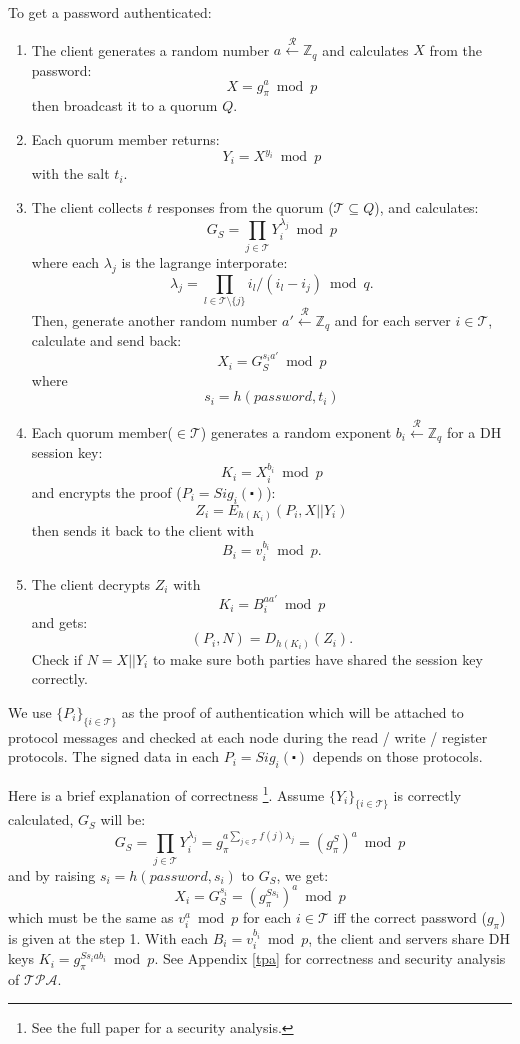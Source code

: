 To get a password authenticated:
\begin{enumerate}
\item The client generates a random number
  $a \xleftarrow{\mathcal{R}} \mathbb{Z}_q$
  and calculates $X$ from the password:
  \[
    X = g_{\pi}^a \bmod p
  \]
  then broadcast it to a quorum $Q$.

\item Each quorum member returns:
  \[
    Y_i = X^{y_i} \bmod p
  \]
  with the salt $t_i$.

\item The client collects $t$ responses from the quorum ($\mathcal{T}
  \subseteq Q$), and
  calculates:
  \[
    G_S = \prod_{j \in \mathcal{T}}Y_i^{\lambda_j} \bmod p
  \]
  where each $\lambda_j$ is the lagrange interporate:
  \[
    \lambda_j = \prod_{l \in \mathcal{T} \setminus \{j\}}
    i_l / (i_l - i_j) \bmod q.
  \]
  Then, generate another random number $a' \xleftarrow{\mathcal{R}}
  \mathbb{Z}_q$ and for each server $i \in \mathcal{T}$, calculate and
  send back:
  \[
    X_i = G_S^{s_ia'} \bmod p
  \]
  where
  \[
    s_i = h(password, t_i)
  \]

\item Each quorum member($\in \mathcal{T}$) generates a random exponent
  $b_i \xleftarrow{\mathcal{R}} \mathbb{Z}_q$
  for a DH session key:
  \[ K_i = X_i^{b_i} \bmod p \]
  and encrypts the proof ($P_i = Sig_i(\centerdot)$):
  \[
    Z_i = E_{h(K_i)}(P_i, X || Y_i)
  \]
  then sends it back to the client with
  \[
    B_i = v_i^{b_i} \bmod p.
  \]

\item The client decrypts $Z_i$ with
  \[
    K_i = B_i^{aa'} \bmod p
  \]
  and gets:
  \[
    (P_i, N) = D_{h(K_i)}(Z_i).
  \]
  Check if $N = X||Y_i$ to make sure both parties have shared the
  session key correctly. 
\end{enumerate}
We use $\{P_i\}_{\{i \in \mathcal{T}\}}$ as the proof of
authentication which will be attached to protocol messages and checked
at each node during the {\sf read / write / register} protocols. The
signed data in each $P_i = Sig_i(\centerdot)$ depends on those
protocols.

\ifdefined\ABSTRACT
Here is a brief explanation of correctness
\footnote{See the full paper for a security analysis.}.
Assume $\{Y_i\}_{\{i \in \mathcal{T}\}}$ is correctly calculated,
$G_S$ will be:
\[
  G_S = \prod_{j \in \mathcal{T}}Y_i^{\lambda_j} = g_{\pi}^{a \sum_{j
      \in \mathcal{T}} f(j) \lambda_j} = (g_{\pi}^S)^a \bmod p
\]
and by raising $s_i = h(password, s_i)$ to $G_S$, we get:
\[
  X_i = G_S^{s_i} = (g_{\pi}^{Ss_i})^a \bmod p
\]
which must be the same as $v_i^a \bmod p$ for each $i \in
\mathcal{T}$ iff the correct password ($g_{\pi}$) is given at the
step 1. With each $B_i = v_i^{b_i} \bmod p$, the client and servers
share DH keys $K_i = g_{\pi}^{Ss_iab_i} \bmod p$.
\else
See Appendix \ref{tpa} for correctness and security analysis of
$\mathcal{TPA}$.
\fi

